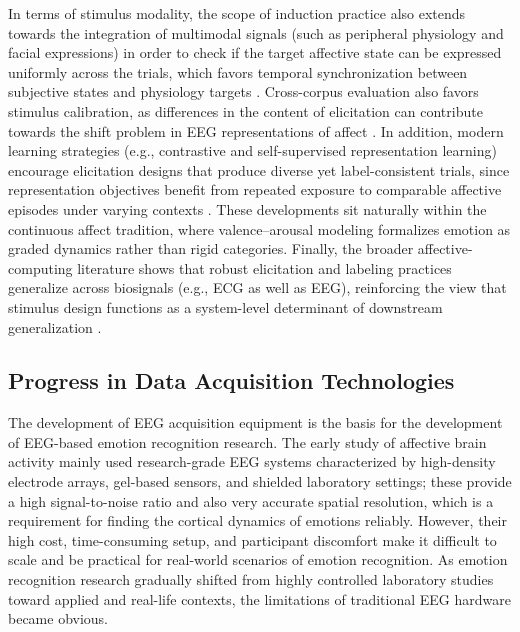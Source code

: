 \documentclass{WileyMSP-template}
\begin{document}
In terms of stimulus modality, the scope of induction practice also extends towards the integration of multimodal signals (such as peripheral physiology and facial expressions) in order to check if the target affective state can be expressed uniformly across the trials, which favors temporal synchronization between subjective states and physiology targets \cite{rayatdoost2020expressionguided}. Cross-corpus evaluation also favors stimulus calibration, as differences in the content of elicitation can contribute towards the shift problem in EEG representations of affect \cite{rayatdoost2018crosscorpus}. In addition, modern learning strategies (e.g., contrastive and self-supervised representation learning) encourage elicitation designs that produce diverse yet label-consistent trials, since representation objectives benefit from repeated exposure to comparable affective episodes under varying contexts \cite{shen2022contrastive}. These developments sit naturally within the continuous affect tradition, where valence–arousal modeling formalizes emotion as graded dynamics rather than rigid categories. Finally, the broader affective-computing literature shows that robust elicitation and labeling practices generalize across biosignals (e.g., ECG as well as EEG), reinforcing the view that stimulus design functions as a system-level determinant of downstream generalization \cite{sarkar2020selfsupervised}.

\subsection{Progress in Data Acquisition Technologies}
The development of EEG acquisition equipment is the basis for the development of EEG-based emotion recognition research. The early study of affective brain activity mainly used research-grade EEG systems characterized by high-density electrode arrays, gel-based sensors, and shielded laboratory settings; these provide a high signal-to-noise ratio and also very accurate spatial resolution, which is a requirement for finding the cortical dynamics of emotions reliably. However, their high cost, time-consuming setup, and participant discomfort make it difficult to scale and be practical for real-world scenarios of emotion recognition. As emotion recognition research gradually shifted from highly controlled laboratory studies toward applied and real-life contexts, the limitations of traditional EEG hardware became obvious.
\end{document}
